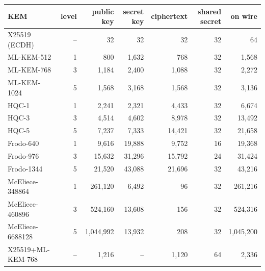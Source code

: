 \begin{tabular}{lrrrrrr}
\toprule
KEM & level & public key & secret key & ciphertext & shared secret & on wire \\
\midrule
X25519 (ECDH) & – & 32 & 32 & 32 & 32 & 64 \\
ML-KEM-512 & 1 & 800 & 1,632 & 768 & 32 & 1,568 \\
ML-KEM-768 & 3 & 1,184 & 2,400 & 1,088 & 32 & 2,272 \\
ML-KEM-1024 & 5 & 1,568 & 3,168 & 1,568 & 32 & 3,136 \\
HQC-1 & 1 & 2,241 & 2,321 & 4,433 & 32 & 6,674 \\
HQC-3 & 3 & 4,514 & 4,602 & 8,978 & 32 & 13,492 \\
HQC-5 & 5 & 7,237 & 7,333 & 14,421 & 32 & 21,658 \\
Frodo-640 & 1 & 9,616 & 19,888 & 9,752 & 16 & 19,368 \\
Frodo-976 & 3 & 15,632 & 31,296 & 15,792 & 24 & 31,424 \\
Frodo-1344 & 5 & 21,520 & 43,088 & 21,696 & 32 & 43,216 \\
McEliece-348864 & 1 & 261,120 & 6,492 & 96 & 32 & 261,216 \\
McEliece-460896 & 3 & 524,160 & 13,608 & 156 & 32 & 524,316 \\
McEliece-6688128 & 5 & 1,044,992 & 13,932 & 208 & 32 & 1,045,200 \\
X25519+ML-KEM-768 & – & 1,216 & – & 1,120 & 64 & 2,336 \\
\bottomrule
\end{tabular}
